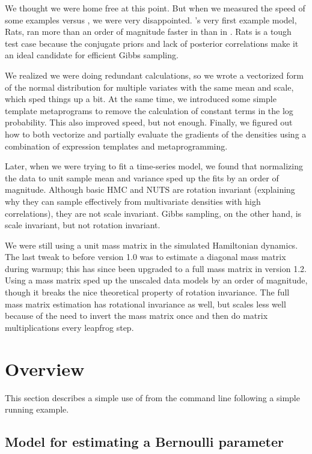 \documentclass[article]{jss}
\begin{document}
We thought we were home free at this point.  But when we measured the
speed of some  examples versus , we were
very disappointed.  's very first example model, Rats,
ran more than an order of magnitude faster in  than in
.  Rats is a tough test case because the conjugate
priors and lack of posterior correlations make it an ideal candidate
for efficient Gibbs sampling.  

We realized we were doing redundant calculations, so we wrote a
vectorized form of the normal distribution for multiple variates with
the same mean and scale, which sped things up a bit. At the same time,
we introduced some simple template metaprograms to remove the
calculation of constant terms in the log probability.  This also
improved speed, but not enough.  Finally, we figured out how to both
vectorize and partially evaluate the gradients of the densities using
a combination of expression templates and metaprogramming. 

Later, when we were trying to fit a time-series model, we found that
normalizing the data to unit sample mean and variance sped up the fits
by an order of magnitude.  Although basic HMC and NUTS are rotation
invariant (explaining why they can sample effectively from
multivariate densities with high correlations), they are not scale
invariant.  Gibbs sampling, on the other hand, is scale invariant, but
not rotation invariant.

We were still using a unit mass matrix in the simulated Hamiltonian
dynamics.  The last tweak to  before version 1.0 was to estimate
a diagonal mass matrix during warmup; this has since been upgraded to
a full mass matrix in  version 1.2.  Using a mass
matrix sped up the unscaled data models by an order of magnitude,
though it breaks the nice theoretical property of rotation invariance.
The full mass matrix estimation has rotational invariance as well, but
scales less well because of the need to invert the mass matrix once
and then do matrix multiplications every leapfrog step.

\section{Overview}

This section describes a simple use of  from the
command line following a simple running example. 

\subsection{Model for estimating a Bernoulli parameter}
\end{document}
